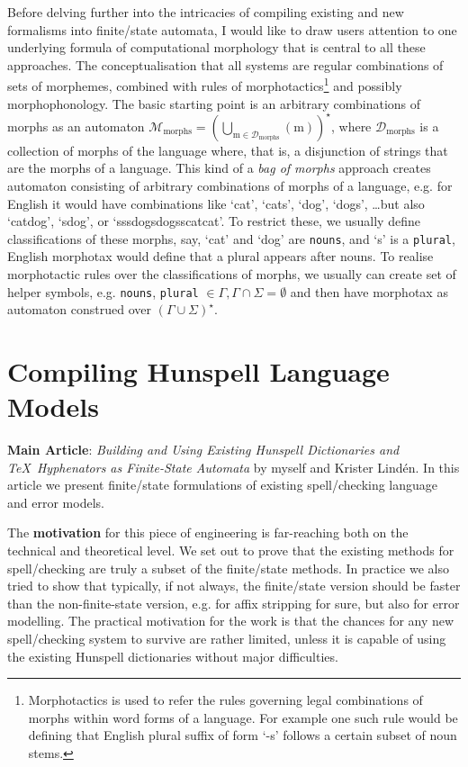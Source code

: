 \documentclass[officiallayout]{unihelcompling}
\begin{document}
Before delving further into the intricacies of compiling existing and new
formalisms into finite\-/state automata, I would like to draw users attention
to one underlying formula of computational morphology that is central to all
these approaches. The conceptualisation that all systems are regular
combinations of sets of morphemes, combined with rules of
\gls{morphotactics}\footnote{Morphotactics is used to refer the rules
    governing legal combinations of morphs within word forms of a language. For
example one such rule would be defining that English plural suffix of form `-s'
follows a certain subset of noun stems.} and possibly morphophonology.  The
basic starting point is an arbitrary combinations of morphs as an automaton
$\mathcal{M}_{\mathrm{morphs}} = (\bigcup_{\mathrm{m \in
{\mathcal{D}_\mathrm{morphs}}}} ({\mathrm{m}}))^\star$, where
$\mathcal{D}_\mathrm{morphs}$ is a collection of morphs of the language where,
that is, a disjunction of strings that are
the morphs of a language.  This kind of a \emph{bag of morphs} approach
creates automaton consisting of arbitrary combinations of morphs of a language,
e.g. for English it would have combinations like `cat', `cats', `dog', `dogs',
\ldots but also `catdog', `sdog', or `sssdogsdogsscatcat'. To restrict these,
we usually define classifications of these morphs, say, `cat' and `dog' are
\texttt{nouns}, and `s' is a \texttt{plural}, English morphotax would define
that a plural appears after nouns. To realise morphotactic rules over the
classifications of morphs, we usually can create set of helper symbols, e.g.
{\texttt{nouns}, \texttt{plural}} $\in \Gamma, \Gamma \cap \Sigma = \emptyset$
and then have morphotax as automaton construed over $(\Gamma \cup
\Sigma)^\star$.

\section{Compiling Hunspell Language Models}
\label{sec:Hunspell}

\textbf{Main Article}: \emph{Building and Using Existing Hunspell Dictionaries
and \TeX\ Hyphenators as Finite-State Automata} by myself and Krister Lindén.
In this article we present finite\-/state formulations of existing spell\-/checking
language and error models.

The \textbf{motivation} for this piece of engineering is far-reaching both on
the technical and theoretical level. We set out to prove that the existing
methods for spell\-/checking are truly a subset of the finite\-/state methods.
In practice we also tried to show that typically, if not always, the
finite\-/state version should be faster than the non-finite-state version, e.g.
for affix stripping for sure, but also for error modelling. The practical
motivation for the work is that the chances for any new spell\-/checking system
to survive are rather limited, unless it is capable of using the existing
Hunspell dictionaries without major difficulties.
\end{document}
